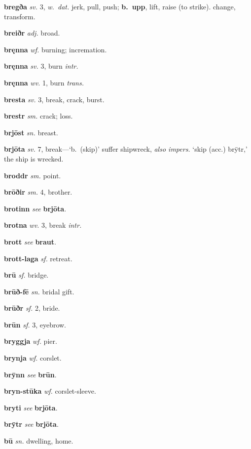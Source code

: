 \documentclass[12pt,letterpaper]{book}
\begin{document}
\noindent
\textbf{bregða} \textit{sv.} 3, \textit{w.\ dat.} jerk, pull, push;
	\textbf{b.\ upp}, lift, raise (to strike). change, transform.

\noindent
\textbf{breiðr} \textit{adj.} broad.

\noindent
\textbf{bręnna} \textit{wf.} burning; incremation.

\noindent
\textbf{bręnna} \textit{sv.} 3, burn \textit{intr.}

\noindent
\textbf{bręnna} \textit{wv.} 1, burn \textit{trans.}

\noindent
\textbf{bresta} \textit{sv.} 3, break, crack, burst.

\noindent
\textbf{brestr} \textit{sm.} crack; loss.

\noindent
\textbf{brjōst} \textit{sn.} breast.

\noindent
\textbf{brjōta} \textit{sv.} 7, break---`b.\ (skip)' suffer shipwreck,
	\textit{also impers.} `skip (acc.) brȳtr,' the ship is wrecked.

\noindent
\textbf{broddr} \textit{sm.} point.

\noindent
\textbf{brōðir} \textit{sm.} 4, brother.

\noindent
\textbf{brotinn} \textit{} \textit{see} \textbf{brjōta}.

\noindent
\textbf{brotna} \textit{wv.} 3, break \textit{intr.}

\noindent
\textbf{brott} \textit{} \textit{see} \textbf{braut}.

\noindent
\textbf{brott-laga} \textit{sf.} retreat.

\noindent
\textbf{brū} \textit{sf.} bridge.

\noindent
\textbf{brūð-fē} \textit{sn.} bridal gift.

\noindent
\textbf{brūðr} \textit{sf.} 2, bride.

\noindent
\textbf{brūn} \textit{sf.} 3, eyebrow.

\noindent
\textbf{bryggja} \textit{wf.} pier.

\noindent
\textbf{brynja} \textit{wf.} corslet.

\noindent
\textbf{brȳnn} \textit{} \textit{see} \textbf{brūn}.

\noindent
\textbf{bryn-stūka} \textit{wf.} corslet-sleeve.

\noindent
\textbf{bryti} \textit{} \textit{see} \textbf{brjōta}.

\noindent
\textbf{brȳtr} \textit{} \textit{see} \textbf{brjōta}.

\noindent
\textbf{bū} \textit{sn.} dwelling, home.
\end{document}
